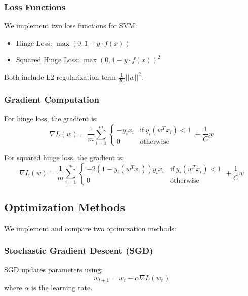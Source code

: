 \documentclass[journal, a4paper]{IEEEtran}
\begin{document}
\subsubsection{Loss Functions}
We implement two loss functions for SVM:

\begin{itemize}
    \item Hinge Loss: $\max(0, 1 - y \cdot f(x))$
    \item Squared Hinge Loss: $\max(0, 1 - y \cdot f(x))^2$
\end{itemize}

Both include L2 regularization term $\frac{1}{2C} ||w||^2$.

\subsubsection{Gradient Computation}
For hinge loss, the gradient is:
\begin{equation}
\nabla L(w) = \frac{1}{m}\sum_{i=1}^{m} \begin{cases} 
-y_i x_i & \text{if}\ y_i(w^T x_i) < 1 \\
0 & \text{otherwise}
\end{cases} + \frac{1}{C}w
\end{equation}

For squared hinge loss, the gradient is:
\begin{equation}
\nabla L(w) = \frac{1}{m}\sum_{i=1}^{m} \begin{cases} 
-2(1-y_i(w^T x_i))y_i x_i & \text{if}\ y_i(w^T x_i) < 1 \\
0 & \text{otherwise}
\end{cases} + \frac{1}{C}w
\end{equation}

\subsection{Optimization Methods}
We implement and compare two optimization methods:

\subsubsection{Stochastic Gradient Descent (SGD)}
SGD updates parameters using:
\begin{equation}
w_{t+1} = w_t - \alpha \nabla L(w_t)
\end{equation}
where $\alpha$ is the learning rate.
\end{document}
